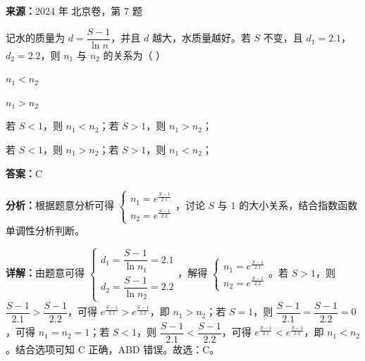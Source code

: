 \begin{question}[points=4]
\textbf{来源：}2024 年 北京卷，第 7 题\par
记水的质量为 $d=\dfrac{S-1}{\ln n}$，并且 $d$ 越大，水质量越好。若 $S$ 不变，且 $d_1=2.1$，$d_2=2.2$，则 $n_1$ 与 $n_2$ 的关系为（ ）
\begin{choices}
  \item $n_1 < n_2$
  \item $n_1 > n_2$
  \item 若 $S<1$，则 $n_1<n_2$；若 $S>1$，则 $n_1>n_2$；
  \item 若 $S<1$，则 $n_1>n_2$；若 $S>1$，则 $n_1<n_2$；
\end{choices}
\begin{solution}
\textbf{答案：}C

\textbf{分析：}根据题意分析可得 $\begin{cases} n_1 = e^{\frac{S-1}{2.1}} \\ n_2 = e^{\frac{S-1}{2.2}} \end{cases}$，讨论 $S$ 与 $1$ 的大小关系，结合指数函数单调性分析判断。

\textbf{详解：}由题意可得 $\begin{cases} d_1 = \dfrac{S-1}{\ln n_1}=2.1 \\ d_2 = \dfrac{S-1}{\ln n_2}=2.2 \end{cases}$，解得 $\begin{cases} n_1 = e^{\frac{S-1}{2.1}} \\ n_2 = e^{\frac{S-1}{2.2}} \end{cases}$。若 $S>1$，则 $\dfrac{S-1}{2.1} > \dfrac{S-1}{2.2}$，可得 $e^{\frac{S-1}{2.1}} > e^{\frac{S-1}{2.2}}$，即 $n_1>n_2$；若 $S=1$，则 $\dfrac{S-1}{2.1} = \dfrac{S-1}{2.2} =0$，可得 $n_1=n_2=1$；若 $S<1$，则 $\dfrac{S-1}{2.1} < \dfrac{S-1}{2.2}$，可得 $e^{\frac{S-1}{2.1}} < e^{\frac{S-1}{2.2}}$，即 $n_1<n_2$。结合选项可知 C 正确，ABD 错误。故选：C。
\end{solution}
\end{question}

